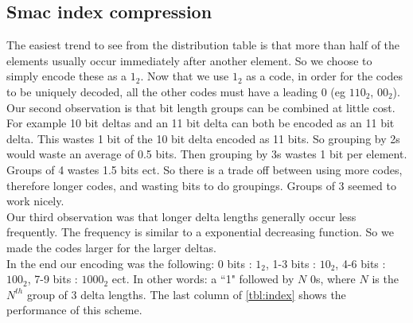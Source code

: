 \subsection{Smac index compression}
The easiest trend to see from the distribution table is that more than half of the elements usually occur immediately after another element. So we choose to simply encode these as a $1_2$. Now that we use $1_2$ as a code, in order for the codes to be uniquely decoded, all the other codes must have a leading 0 (eg $110_2$, $00_2$). \\
\indent  Our second observation is that bit length groups can be combined at little cost. For example 10 bit deltas and an 11 bit delta can both be encoded as an 11 bit delta. This wastes 1 bit of the 10 bit delta encoded as 11 bits. So grouping by 2s would waste an average of 0.5 bits. Then grouping by 3s wastes 1 bit per element. Groups of 4 wastes 1.5 bits ect. So there is a trade off between using more codes, therefore longer codes, and wasting bits to do groupings. Groups of 3 seemed to work nicely.\\
\indent Our third observation was that longer delta lengths generally occur less frequently. The frequency is similar to a exponential decreasing function. So we made the codes larger for the larger deltas.\\
\indent In the end our encoding was the following: 0 bits : $1_2$, 1-3 bits : $10_2$, 4-6 bits : $100_2$, 7-9 bits : $1000_2$ ect. In other words: a ``1" followed by $N$ 0s, where $N$ is the $N^{th}$ group of 3 delta lengths. The last column of \ref{tbl:index} shows the performance of this scheme.

